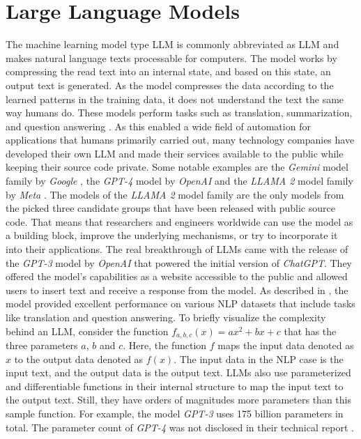 \documentclass[draft,final]{thesisclass} %
\begin{document}
\section{Large Language Models}
The machine learning model type \gls{LLM} is commonly abbreviated as \gls{LLM} and makes natural language texts processable for computers.
The model works by compressing the read text into an internal state, and based on this state, an output text is generated.
As the model compresses the data according to the learned patterns in the training data, it does not understand the text the same way humans do.
These models perform tasks such as translation, summarization, and question answering \parencite[1]{llm_literature_review}.
As this enabled a wide field of automation for applications that humans primarily carried out, many technology companies have developed their own \gls{LLM} and made their services available to the public while keeping their source code private.
Some notable examples are the \textit{Gemini} model family by \textit{Google} \parencite{gemini}, the \textit{GPT-4} model by \textit{OpenAI} \parencite{gpt4} and the \textit{LLAMA 2} model family by \textit{Meta} \parencite{llama2}.
The models of the \textit{LLAMA 2} model family are the only models from the picked three candidate groups that have been released with public source code.
That means that researchers and engineers worldwide can use the model as a building block, improve the underlying mechanisms, or try to incorporate it into their applications.
The real breakthrough of \gls{LLM}s came with the release of the \textit{GPT-3} model by \textit{OpenAI} \parencite{gpt3} that powered the initial version of \textit{ChatGPT}.
They offered the model's capabilities as a website accessible to the public and allowed users to insert text and receive a response from the model.
As described in \textcite[1]{gpt3}, the model provided excellent performance on various \acs{NLP} datasets that include tasks like translation and question answering.
To briefly visualize the complexity behind an \gls{LLM}, consider the function $f_{a,b,c}(x) = ax^2+bx+c$ that has the three parameters $a$, $b$ and $c$.
Here, the function $f$ maps the input data denoted as $x$ to the output data denoted as $f(x)$.
The input data in the \acs{NLP} case is the input text, and the output data is the output text.
\gls{LLM}s also use parameterized and differentiable functions in their internal structure to map the input text to the output text. Still, they have orders of magnitudes more parameters than this sample function.
For example, the model \textit{GPT-3} uses 175 billion parameters \parencite[1]{gpt3} in total. The parameter count of \textit{GPT-4} was not disclosed in their technical report \parencite{gpt4}.
\end{document}
